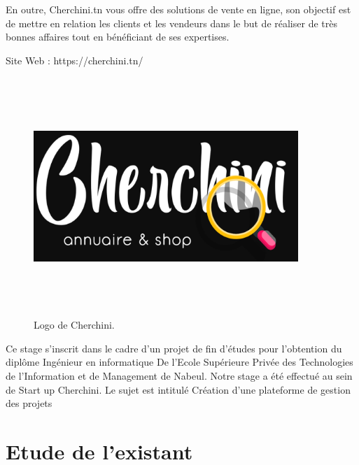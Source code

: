 \bigskip
 En outre, Cherchini.tn vous offre des solutions de vente en ligne, son objectif
est de mettre en relation les clients et les vendeurs dans le but de r\'{e}aliser de
tr\`{e}s bonnes affaires tout en b\'{e}n\'{e}ficiant de ses expertises.

Site Web : https://cherchini.tn/

\bigskip

  \FloatBarrier
\begin{figure}[H]
\center
\includegraphics[width=10cm,height=9cm]{./figures/cherchini-logo.png}
\caption{Logo de Cherchini.}

\end{figure}


Ce stage s'inscrit dans le cadre d'un projet de fin d'\'{e}tudes pour l'obtention du
dipl\^{o}me Ing\'{e}nieur en informatique De l'Ecole Sup\'{e}rieure Priv\'{e}e des
Technologies de l'Information et de Management de Nabeul.
Notre stage a \'{e}t\'{e} effectu\'{e} au sein de Start up Cherchini.
Le sujet est intitul\'{e} \guillemotleft{}Cr\'{e}ation d'une plateforme de gestion des projets\guillemotright{}



\section{ Etude de l'existant  }



